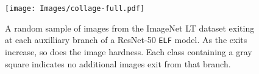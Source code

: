 \documentclass{article}
\newcommand{\method}{\texttt{ELF}\xspace}
\begin{document}
\begin{figure}[h!]
    \centering
    \texttt{[image: Images/collage-full.pdf]}
    \caption{
    A random sample of images from the ImageNet LT dataset exiting at each auxilliary branch of a ResNet-50 \method{} model.
    As the exits increase, so does the image hardness. 
    Each class containing a gray square indicates no additional images exit from that branch.
    }
    \label{fig:collage-full}
\end{figure}




 
\end{document}
